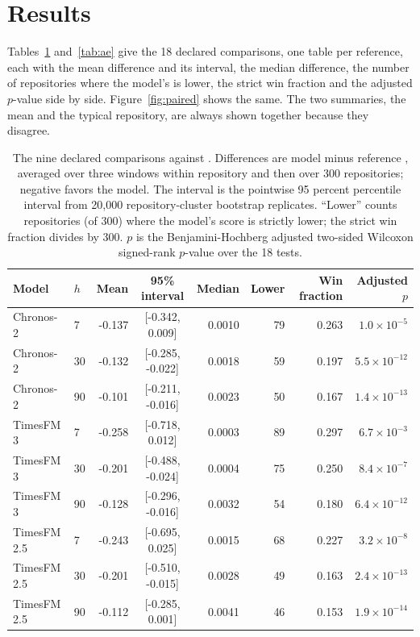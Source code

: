 \section{Results}
\label{sec:results}

Tables~\ref{tab:lm} and~\ref{tab:ae} give the 18 declared comparisons, one table per reference, each with the
mean difference and its interval, the median difference, the number of repositories where the model's \qs{}
is lower, the strict win fraction and the adjusted $p$-value side by side. Figure~\ref{fig:paired} shows the
same. The two summaries, the mean and the typical repository, are always shown together because they
disagree.

\begin{table}[t]
\centering\small
\caption{The nine declared comparisons against \lm{}. Differences are model minus reference \qs{}, averaged
over three windows within repository and then over 300 repositories; negative favors the model. The interval
is the pointwise 95 percent percentile interval from 20,000 repository-cluster bootstrap replicates. ``Lower''
counts repositories (of 300) where the model's score is strictly lower; the strict win fraction divides by
300. $p$ is the Benjamini-Hochberg adjusted two-sided Wilcoxon signed-rank $p$-value over the 18 tests.}
\label{tab:lm}
\begin{tabular}{llrcrrrr}
\toprule
Model & $h$ & Mean & 95\% interval & Median & Lower & Win fraction & Adjusted $p$ \\
\midrule
Chronos-2 & 7 & -0.137 & [-0.342, 0.009] & 0.0010 & 79 & 0.263 & $1.0 \times 10^{-5}$ \\
Chronos-2 & 30 & -0.132 & [-0.285, -0.022] & 0.0018 & 59 & 0.197 & $5.5 \times 10^{-12}$ \\
Chronos-2 & 90 & -0.101 & [-0.211, -0.016] & 0.0023 & 50 & 0.167 & $1.4 \times 10^{-13}$ \\
TimesFM 3 & 7 & -0.258 & [-0.718, 0.012] & 0.0003 & 89 & 0.297 & $6.7 \times 10^{-3}$ \\
TimesFM 3 & 30 & -0.201 & [-0.488, -0.024] & 0.0004 & 75 & 0.250 & $8.4 \times 10^{-7}$ \\
TimesFM 3 & 90 & -0.128 & [-0.296, -0.016] & 0.0032 & 54 & 0.180 & $6.4 \times 10^{-12}$ \\
TimesFM 2.5 & 7 & -0.243 & [-0.695, 0.025] & 0.0015 & 68 & 0.227 & $3.2 \times 10^{-8}$ \\
TimesFM 2.5 & 30 & -0.201 & [-0.510, -0.015] & 0.0028 & 49 & 0.163 & $2.4 \times 10^{-13}$ \\
TimesFM 2.5 & 90 & -0.112 & [-0.285, 0.001] & 0.0041 & 46 & 0.153 & $1.9 \times 10^{-14}$ \\
\bottomrule
\end{tabular}
\end{table}

